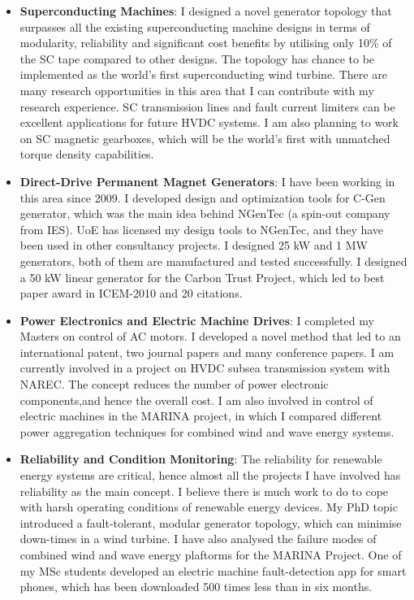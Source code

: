 \documentclass[a4paper,12pt]{article}
\begin{document}
\begin{itemize}
\item \textbf{Superconducting Machines}: I designed a novel generator topology that surpasses all the existing superconducting machine designs in terms of modularity, reliability and significant cost benefits by utilising only 10\% of the SC tape compared to other designs. The topology has chance to be implemented as the world's first superconducting wind turbine. There are many research opportunities in this area that I can contribute with my research experience. SC transmission lines and fault current limiters can be excellent applications for future HVDC systems. I am also planning to work on SC magnetic gearboxes, which will be the world’s first with unmatched torque density capabilities.

\item \textbf{Direct-Drive Permanent Magnet Generators}: I have been working in this area since 2009. I developed design and optimization tools for C-Gen generator, which was the main idea behind NGenTec (a spin-out company from IES). UoE has licensed my design tools  to NGenTec, and they have been used in other consultancy projects. I designed 25 kW and 1 MW generators, both of them are manufactured and tested successfully. I designed a 50 kW linear generator for the Carbon Trust Project, which led to best paper award in ICEM-2010 and 20 citations.

\item \textbf{Power Electronics and Electric Machine Drives}: I completed my Masters on control of AC motors. I developed a novel method that led to an international patent, two journal papers and many conference papers. I am currently involved in a project on HVDC subsea transmission system with NAREC. The concept reduces the number of power electronic components,and hence the overall cost. I am also involved in control of electric machines in the MARINA project, in which I compared different power aggregation techniques for combined wind and wave energy systems.

\item \textbf{Reliability and Condition Monitoring}: The reliability for renewable energy systems are critical, hence almost all the projects I have involved has reliability as the main concept. I believe there is much work to do to cope with harsh operating conditions of renewable energy devices. My PhD topic introduced a fault-tolerant, modular generator topology, which can minimise down-times in a wind turbine. I have also analysed the failure modes of combined wind and wave energy plaftorms for the MARINA Project. One of my MSc students developed an electric machine fault-detection app for smart phones, which has been downloaded 500 times less than in six months.
\end{itemize}
\end{document}
